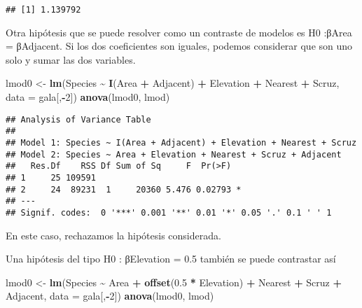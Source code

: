 \documentclass[
]{article}
\newenvironment{Shaded}{\begin{snugshade}}{\end{snugshade}}
\newcommand{\AttributeTok}[1]{\textcolor[rgb]{0.13,0.29,0.53}{#1}}
\newcommand{\DecValTok}[1]{\textcolor[rgb]{0.00,0.00,0.81}{#1}}
\newcommand{\FloatTok}[1]{\textcolor[rgb]{0.00,0.00,0.81}{#1}}
\newcommand{\FunctionTok}[1]{\textcolor[rgb]{0.13,0.29,0.53}{\textbf{#1}}}
\newcommand{\NormalTok}[1]{#1}
\newcommand{\OtherTok}[1]{\textcolor[rgb]{0.56,0.35,0.01}{#1}}
\newcommand{\SpecialCharTok}[1]{\textcolor[rgb]{0.81,0.36,0.00}{\textbf{#1}}}
\begin{document}
\begin{verbatim}
## [1] 1.139792
\end{verbatim}

Otra hipótesis que se puede resolver como un contraste de modelos es H0
:βArea = βAdjacent. Si los dos coeficientes son iguales, podemos
considerar que son uno solo y sumar las dos variables.

\begin{Shaded}
\begin{Highlighting}[]
\NormalTok{lmod0 }\OtherTok{\textless{}{-}} \FunctionTok{lm}\NormalTok{(Species }\SpecialCharTok{\textasciitilde{}} \FunctionTok{I}\NormalTok{(Area }\SpecialCharTok{+}\NormalTok{ Adjacent) }\SpecialCharTok{+}\NormalTok{ Elevation }\SpecialCharTok{+}\NormalTok{ Nearest }\SpecialCharTok{+}
\NormalTok{Scruz, }\AttributeTok{data =}\NormalTok{ gala[,}\SpecialCharTok{{-}}\DecValTok{2}\NormalTok{])}
\FunctionTok{anova}\NormalTok{(lmod0, lmod)}
\end{Highlighting}
\end{Shaded}

\begin{verbatim}
## Analysis of Variance Table
## 
## Model 1: Species ~ I(Area + Adjacent) + Elevation + Nearest + Scruz
## Model 2: Species ~ Area + Elevation + Nearest + Scruz + Adjacent
##   Res.Df    RSS Df Sum of Sq     F  Pr(>F)  
## 1     25 109591                             
## 2     24  89231  1     20360 5.476 0.02793 *
## ---
## Signif. codes:  0 '***' 0.001 '**' 0.01 '*' 0.05 '.' 0.1 ' ' 1
\end{verbatim}

En este caso, rechazamos la hipótesis considerada.

Una hipótesis del tipo H0 : βElevation = 0.5 también se puede contrastar
así

\begin{Shaded}
\begin{Highlighting}[]
\NormalTok{lmod0 }\OtherTok{\textless{}{-}} \FunctionTok{lm}\NormalTok{(Species }\SpecialCharTok{\textasciitilde{}}\NormalTok{ Area }\SpecialCharTok{+} \FunctionTok{offset}\NormalTok{(}\FloatTok{0.5} \SpecialCharTok{*}\NormalTok{ Elevation) }\SpecialCharTok{+}\NormalTok{ Nearest }\SpecialCharTok{+}
\NormalTok{Scruz }\SpecialCharTok{+}\NormalTok{ Adjacent, }\AttributeTok{data =}\NormalTok{ gala[,}\SpecialCharTok{{-}}\DecValTok{2}\NormalTok{])}
\FunctionTok{anova}\NormalTok{(lmod0, lmod)}
\end{Highlighting}
\end{Shaded}
\end{document}
